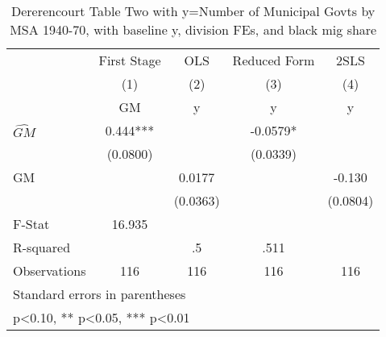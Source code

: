 \begin{table}[htbp]\centering
\def\sym#1{\ifmmode^{#1}\else\(^{#1}\)\fi}
\caption{Dererencourt Table Two with y=Number of Municipal Govts by MSA 1940-70, with baseline y, division FEs, and black mig share}
\begin{tabular}{l*{4}{c}}
\toprule
                    & First Stage   &         OLS   &Reduced Form   &        2SLS   \\
                    &\multicolumn{1}{c}{(1)}&\multicolumn{1}{c}{(2)}&\multicolumn{1}{c}{(3)}&\multicolumn{1}{c}{(4)}\\
                    &\multicolumn{1}{c}{GM}&\multicolumn{1}{c}{y}&\multicolumn{1}{c}{y}&\multicolumn{1}{c}{y}\\
\midrule
$\hat{GM}$          &       0.444***&               &     -0.0579*  &               \\
                    &    (0.0800)   &               &    (0.0339)   &               \\
\addlinespace
GM                  &               &      0.0177   &               &      -0.130   \\
                    &               &    (0.0363)   &               &    (0.0804)   \\
\midrule
F-Stat              &      16.935   &               &               &               \\
R-squared           &               &          .5   &        .511   &               \\
Observations        &         116   &         116   &         116   &         116   \\
\bottomrule
\multicolumn{5}{l}{\footnotesize Standard errors in parentheses}\\
\multicolumn{5}{l}{\footnotesize * p<0.10, ** p<0.05, *** p<0.01}\\
\end{tabular}
\end{table}
